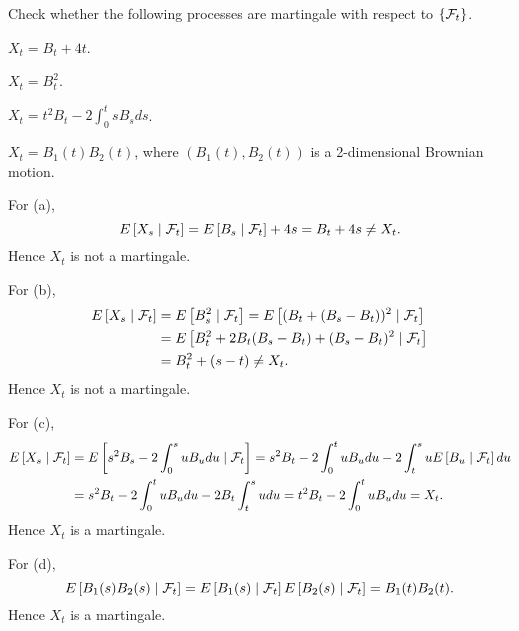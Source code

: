 \begin{exercise}{3.4}\label{ex:3.4}
    Check whether the following processes are martingale with respect to $\left\{ {\mathcal{F}_t} \right\}$. 
    \begin{thmenum}
        \item $X_t = B_t + 4t$. 
        \item $X_t = B_t^2$. 
        \item $X_t = t^2B_t - 2\int_0^t sB_s ds$.
        \item $X_t = B_1(t)B_2(t)$, where $(B_1(t), B_2(t))$ is a 2-dimensional Brownian motion.
    \end{thmenum} 
\end{exercise}
\begin{solution}
    For (a), 
    \begin{equation*}
        E\left[ {X_s\mid\mathcal{F}_t} \right] = E\left[ {B_s\mid\mathcal{F}_t} \right] + 4s = B_t + 4s \neq X_t.
    \end{equation*}
    Hence $X_t$ is not a martingale.

    For (b), 
    \begin{equation*}
        \begin{split}
            E\left[ {X_s\mid\mathcal{F}_t} \right] &= E\left[ {B_s^2\mid\mathcal{F}_t} \right] = E\left[ {(B_t + (B_s - B_t))^2\mid\mathcal{F}_t} \right] \\
            &= E\left[ {B_t^2 + 2B_t(B_s - B_t) + (B_s - B_t)^2\mid\mathcal{F}_t} \right] \\
            &= B_t^2 + (s-t) \neq X_t.
        \end{split}
    \end{equation*}
    Hence $X_t$ is not a martingale.

    For (c), 
    \begin{equation*}
        \begin{split}
            E\left[ {X_s\mid\mathcal{F}_t} \right] &= E\left[ {s^2B_s - 2\int_0^s uB_udu\mid\mathcal{F}_t} \right] 
            = s^2B_t - 2\int_0^t uB_udu - 2\int_t^s uE\left[ {B_u\mid\mathcal{F}_t} \right]du \\ 
            &= s^2B_t - 2\int_0^t uB_udu - 2B_t\int_t^s udu
            = t^2B_t - 2\int_0^t uB_udu = X_t.
        \end{split}
    \end{equation*}
    Hence $X_t$ is a martingale. 

    For (d), 
    \begin{equation*}
        E\left[ {B_1(s)B_2(s)\mid\mathcal{F}_t} \right] = E\left[ {B_1(s)\mid\mathcal{F}_t} \right]E\left[ {B_2(s)\mid\mathcal{F}_t} \right] = B_1(t)B_2(t).
    \end{equation*}
    Hence $X_t$ is a martingale.
\end{solution}

